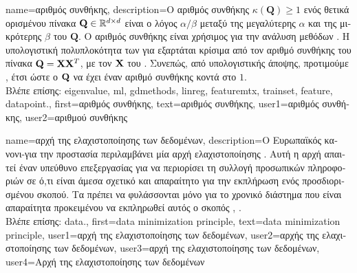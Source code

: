 {name={\foreignlanguage{greek}{αριθμός συνθήκης}},
	description={\foreignlanguage{greek}{O αριθμός συνθήκης} 
		$\kappa(\mathbf{Q}) \geq 1$ \foreignlanguage{greek}{ενός θετικά ορισμένου πίνακα $\mathbf{Q} \in \mathbb{R}^{d \times d}$ είναι ο  
		λόγος $\alpha /\beta $ μεταξύ της μεγαλύτερης $\alpha$ και της μικρότερης $\beta$}  \foreignlanguage{greek}{του} 
		$\mathbf{Q}$. \foreignlanguage{greek}{O αριθμός συνθήκης είναι χρήσιμος για την ανάλυση μεθόδων} . 
		\foreignlanguage{greek}{Η υπολογιστική πολυπλοκότητα των}  \foreignlanguage{greek}{για}  
		\foreignlanguage{greek}{εξαρτάται κρίσιμα από τον αριθμό συνθήκης του πίνακα $\mathbf{Q} = {\bf X} {\bf X}^{T}$, με τον}  ${\bf X}$ 
		\foreignlanguage{greek}{του} . \foreignlanguage{greek}{Συνεπώς, από υπολογιστικής άποψης, προτιμούμε}   
		, \foreignlanguage{greek}{έτσι ώστε ο $\mathbf{Q}$ να έχει έναν αριθμό συνθήκης κοντά στο} $1$.\\
		\foreignlanguage{greek}{Βλέπε επίσης:} \gls{eigenvalue}, \gls{ml}, \gls{gdmethods}, \gls{linreg}, \gls{featuremtx}, \gls{trainset}, \gls{feature}, \gls{datapoint}.},
	first={\foreignlanguage{greek}{αριθμός συνθήκης}},
	text={\foreignlanguage{greek}{αριθμός συνθήκης}},
	user1={\foreignlanguage{greek}{αριθμός συνθήκης}}, %
	user2={\foreignlanguage{greek}{αριθμού συνθήκης}} %
}

{name={\foreignlanguage{greek}{αρχή της ελαχιστοποίησης των δεδομένων}},
	description={\foreignlanguage{greek}{Ο Ευρωπαϊκός κανονι- για την προστασία}  \foreignlanguage{greek}{περιλαμβάνει μία αρχή ελαχιστο\-ποί\-ησης} . 
		\foreignlanguage{greek}{Αυτή η αρχή απαιτεί έναν υπεύθυνο επεξεργασίας}  \foreignlanguage{greek}{για να περιορίσει  
		τη συλλογή προσωπικών πληροφοριών σε ό,τι είναι άμεσα σχετικό και απαραίτητο για την εκπλήρωση ενός προσδιορισμένου  
		σκοπού. Τα}  \foreignlanguage{greek}{πρέπει να φυλάσσονται μόνο για το χρονικό διάστημα που είναι απαραίτητα προκειμένου να 
		εκπληρωθεί αυτός ο σκοπός} \cite[\foreignlanguage{greek}{Άρθρο} 5(1)(c)]{GDPR2016}, \cite{EURegulation2018}.\\
		\foreignlanguage{greek}{Βλέπε επίσης:} \gls{data}.}, 
	first={data minimization principle},
	text={data minimization principle},
	user1={\foreignlanguage{greek}{αρχή της ελαχιστοποίησης των δεδομένων}}, %
  	user2={\foreignlanguage{greek}{αρχής της ελαχιστοποίησης των δεδομένων}}, %
	user3={\foreignlanguage{greek}{αρχή της ελαχιστοποίησης των δεδομένων}}, %
	user4={\foreignlanguage{greek}{Αρχή της ελαχιστοποίησης των δεδομένων}} %
}

